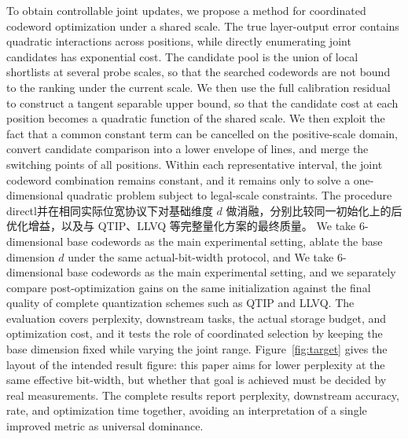 To obtain controllable joint updates, we propose a method for coordinated codeword optimization under a shared scale.
The true layer-output error contains quadratic interactions across positions, while directly enumerating joint candidates has exponential cost.
The candidate pool is the union of local shortlists at several probe scales, so that the searched codewords are not bound to the ranking under the current scale.
We then use the full calibration residual to construct a tangent separable upper bound, so that the candidate cost at each position becomes a quadratic function of the shared scale.
We then exploit the fact that a common constant term can be cancelled on the positive-scale domain, convert candidate comparison into a lower envelope of lines, and merge the switching points of all positions.
Within each representative interval, the joint codeword combination remains constant, and it remains only to solve a one-dimensional quadratic problem subject to legal-scale constraints.
The procedure directl并在相同实际位宽协议下对基础维度 $d$ 做消融，分别比较同一初始化上的后优化增益，以及与 QTIP、LLVQ 等完整量化方案的最终质量。
We take 6-dimensional base codewords as the main experimental setting, ablate the base dimension $d$ under the same actual-bit-width protocol, and
We take 6-dimensional base codewords as the main experimental setting, and we separately compare post-optimization gains on the same initialization against the final quality of complete quantization schemes such as QTIP and LLVQ.
The evaluation covers perplexity, downstream tasks, the actual storage budget, and optimization cost, and it tests the role of coordinated selection by keeping the base dimension fixed while varying the joint range.
Figure~\ref{fig:target} gives the layout of the intended result figure: this paper aims for lower perplexity at the same effective bit-width, but whether that goal is achieved must be decided by real measurements.
The complete results report perplexity, downstream accuracy, rate, and optimization time together, avoiding an interpretation of a single improved metric as universal dominance.

